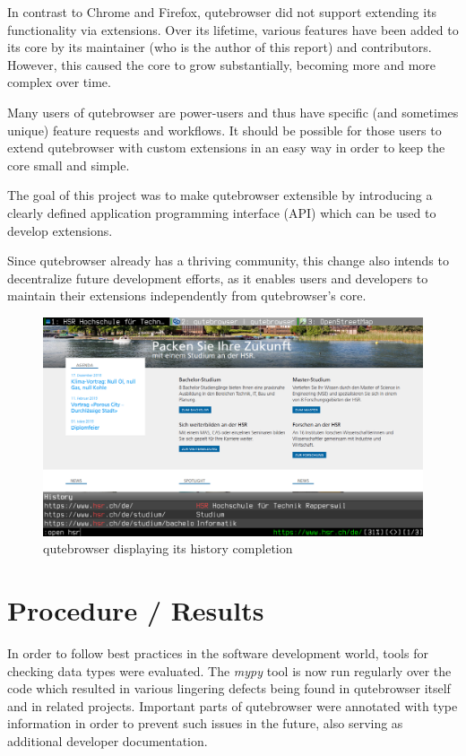 In contrast to Chrome and Firefox, qutebrowser did not support extending its
functionality via extensions. Over its lifetime, various features have been
added to its core by its maintainer (who is the author of this report) and
contributors. However, this caused the core to grow substantially, becoming more
and more complex over time.

Many users of qutebrowser are power-users and thus have specific (and sometimes
unique) feature requests and workflows. It should be possible for those users to
extend qutebrowser with custom extensions in an easy way in order to keep the
core small and simple.

The goal of this project was to make qutebrowser extensible by introducing a
clearly defined application programming interface (API) which can be used to
develop extensions.

Since qutebrowser already has a thriving community, this change also intends to
decentralize future development efforts, as it enables users and developers to
maintain their extensions independently from qutebrowser's core.

\begin{figure}[H]
\includegraphics[width=\linewidth]{img/screenshot-intro.png}
\caption{qutebrowser displaying its history completion}
\end{figure}

\section*{Procedure / Results}
In order to follow best practices in the software development world,
tools for checking data types were evaluated. The \emph{mypy} tool is now run
regularly over the code which resulted in various lingering defects
being found in qutebrowser itself and in related projects. Important parts of
qutebrowser were annotated with type information in order to prevent such issues
in the future, also serving as additional developer documentation.

